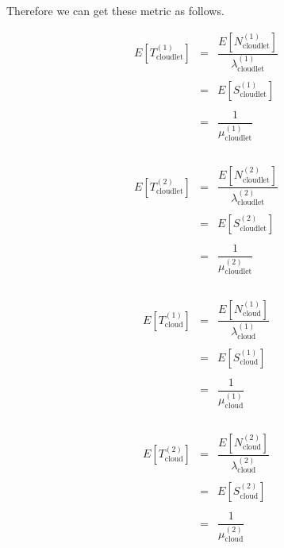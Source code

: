 \documentclass[10pt,a4paper]{article}
\begin{document}
Therefore we can get these metric as follows.

\begin{equation}
\begin{array} {rcl} 
E[T_{\text{cloudlet}}^{(1)}] & = & \dfrac{E[N_{\text{cloudlet}}^{(1)}]}{\lambda_{\text{cloudlet}}^{(1)}} \\\\

& = & E[S_{\text{cloudlet}}^{(1)}] \\\\

& = & \dfrac{1}{\mu_{\text{cloudlet}}^{(1)}} \\\\
\end{array}
\end{equation}

\begin{equation}
\begin{array} {rcl} 
E[T_{\text{cloudlet}}^{(2)}] & = & \dfrac{E[N_{\text{cloudlet}}^{(2)}]}{\lambda_{\text{cloudlet}}^{(2)}} \\\\

& = & E[S_{\text{cloudlet}}^{(2)}] \\\\

& = & \dfrac{1}{\mu_{\text{cloudlet}}^{(2)}} \\\\
\end{array}
\end{equation}

\begin{equation}
\begin{array} {rcl} 
E[T_{\text{cloud}}^{(1)}] & = & \dfrac{E[N_{\text{cloud}}^{(1)}]}{\lambda_{\text{cloud}}^{(1)}} \\\\

& = & E[S_{\text{cloud}}^{(1)}] \\\\

& = & \dfrac{1}{\mu_{\text{cloud}}^{(1)}} \\\\
\end{array}
\end{equation}

\begin{equation}
\begin{array} {rcl} 
E[T_{\text{cloud}}^{(2)}] & = & \dfrac{E[N_{\text{cloud}}^{(2)}]}{\lambda_{\text{cloud}}^{(2)}} \\\\

& = & E[S_{\text{cloud}}^{(2)}] \\\\

& = & \dfrac{1}{\mu_{\text{cloud}}^{(2)}} \\\\
\end{array}
\end{equation}
\end{document}
